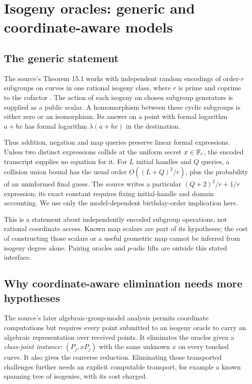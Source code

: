 \section{Isogeny oracles: generic and coordinate-aware models}

\subsection{The generic statement}
The source's Theorem 15.1 works with independent random encodings of
order-$r$ subgroups on curves in one rational isogeny class, where $r$
is prime and coprime to the cofactor \cite{isogenySource}. The action of
each isogeny on chosen subgroup generators is supplied as a public
scalar. A homomorphism between these cyclic subgroups is either zero
or an isomorphism. Its answer on a point with formal logarithm $a+bx$
has formal logarithm $\lambda(a+bx)$ in the destination.

Thus addition, negation and map queries preserve linear formal
expressions. Unless two distinct expressions collide at the uniform
secret $x\in\mathbb F_r$, the encoded transcript supplies no equation for it.
For $L$ initial handles and $Q$ queries, a collision union bound has the
usual order $O((L+Q)^2/r)$, plus the probability of an uninformed final
guess. The source writes a particular $(Q+2)^2/r+1/r$ expression;
its exact constant requires fixing initial-handle and domain accounting.
We use only the model-dependent birthday-order implication here.

This is a statement about independently encoded subgroup operations,
not rational coordinate access. Known map scalars are part of its
hypotheses; the cost of constructing those scalars or a useful geometric
map cannot be inferred from isogeny degree alone. Pairing oracles and
$p$-adic lifts are outside this stated interface.

\subsection{Why coordinate-aware elimination needs more hypotheses}
The source's later algebraic-group-model analysis
\cite{agmIsogeny} permits coordinate computations but requires every
point submitted to an isogeny oracle to carry an algebraic
representation over received points. It eliminates the oracles given
a \emph{class-joint instance}: $(P_j,xP_j)$ with the same unknown $x$
on every touched curve. It also gives the converse reduction. Eliminating
those transported challenges further needs an explicit computable
transport, for example a known spanning tree of isogenies, with its
cost charged.

